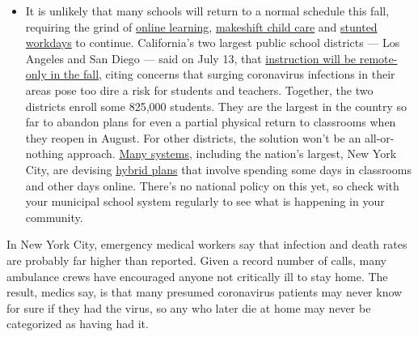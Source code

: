 \begin{itemize}
  \begin{itemize}
  \tightlist
  \item
    It is unlikely that many schools will return to a normal schedule
    this fall, requiring the grind of
    \href{https://www.nytimes3xbfgragh.onion/2020/06/05/us/coronavirus-education-lost-learning.html?action=click\&pgtype=Article\&state=default\&region=MAIN_CONTENT_3\&context=storylines_faq}{online
    learning},
    \href{https://www.nytimes3xbfgragh.onion/2020/05/29/us/coronavirus-child-care-centers.html?action=click\&pgtype=Article\&state=default\&region=MAIN_CONTENT_3\&context=storylines_faq}{makeshift
    child care} and
    \href{https://www.nytimes3xbfgragh.onion/2020/06/03/business/economy/coronavirus-working-women.html?action=click\&pgtype=Article\&state=default\&region=MAIN_CONTENT_3\&context=storylines_faq}{stunted
    workdays} to continue. California's two largest public school
    districts --- Los Angeles and San Diego --- said on July 13, that
    \href{https://www.nytimes3xbfgragh.onion/2020/07/13/us/lausd-san-diego-school-reopening.html?action=click\&pgtype=Article\&state=default\&region=MAIN_CONTENT_3\&context=storylines_faq}{instruction
    will be remote-only in the fall}, citing concerns that surging
    coronavirus infections in their areas pose too dire a risk for
    students and teachers. Together, the two districts enroll some
    825,000 students. They are the largest in the country so far to
    abandon plans for even a partial physical return to classrooms when
    they reopen in August. For other districts, the solution won't be an
    all-or-nothing approach.
    \href{https://bioethics.jhu.edu/research-and-outreach/projects/eschool-initiative/school-policy-tracker/}{Many
    systems}, including the nation's largest, New York City, are
    devising
    \href{https://www.nytimes3xbfgragh.onion/2020/06/26/us/coronavirus-schools-reopen-fall.html?action=click\&pgtype=Article\&state=default\&region=MAIN_CONTENT_3\&context=storylines_faq}{hybrid
    plans} that involve spending some days in classrooms and other days
    online. There's no national policy on this yet, so check with your
    municipal school system regularly to see what is happening in your
    community.
  \end{itemize}
\end{itemize}

In New York City, emergency medical workers say that infection and death
rates are probably far higher than reported. Given a record number of
calls, many ambulance crews have encouraged anyone not critically ill to
stay home. The result, medics say, is that many presumed coronavirus
patients may never know for sure if they had the virus, so any who later
die at home may never be categorized as having had it.

